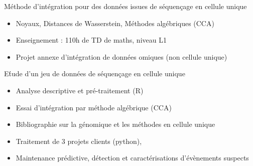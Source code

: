 \documentclass[10pt,a4paper]{altacv}
\begin{document}




 Méthode d'intégration pour des données issues de séquençage en cellule unique
\begin{itemize}
\item Noyaux, Distances de Wasserstein, Méthodes algébriques (CCA)
\item Enseignement : 110h de TD de maths, niveau L1
\item Projet annexe d'intégration de données omiques (non cellule unique)
\end{itemize}

E\'tude d'un jeu de données de séquençage en cellule unique %
\begin{itemize}
\item Analyse descriptive et pré-traitement (R) 
\item Essai d'intégration par méthode algébrique (CCA) 
\item Bibliographie sur la génomique et les méthodes en cellule unique
\end{itemize}

{}

\begin{itemize}
\item Traitement de 3 projets clients (python), 
\item Maintenance prédictive, détection et caractérisations d'évènements suspects
\end{itemize}
\end{document}
